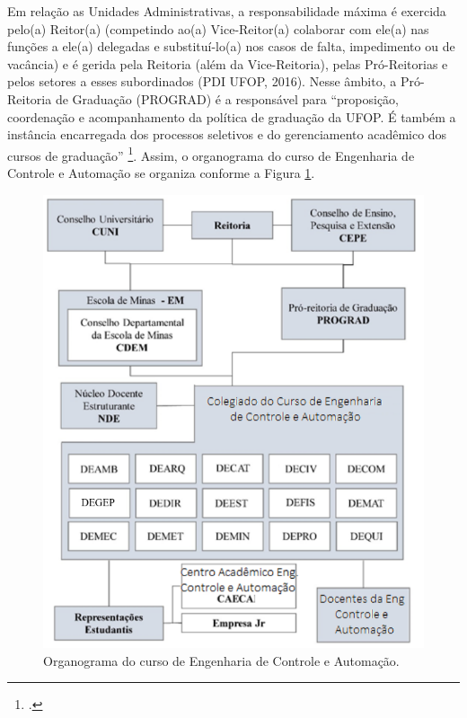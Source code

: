 \documentclass[
	12pt,				%
	openright,			%
	oneside,			%
	a4paper,			%
	english,			%
	brazil				%
	]{abntex2}
\begin{document}
Em relação as Unidades Administrativas, a responsabilidade máxima é exercida pelo(a) Reitor(a) (competindo ao(a) Vice-Reitor(a) colaborar com ele(a) nas funções a ele(a) delegadas e substituí-lo(a) nos casos de falta, impedimento ou de vacância) e é gerida pela Reitoria (além da Vice-Reitoria), pelas Pró-Reitorias e pelos setores a esses subordinados (PDI UFOP, 2016). Nesse âmbito, a Pró-Reitoria de Graduação (PROGRAD) é a responsável para “proposição, coordenação e acompanhamento da política de graduação da UFOP. É também a instância encarregada dos processos seletivos e do gerenciamento acadêmico dos cursos de graduação” \footcite{PDI-UFOP}. Assim, o organograma do curso de Engenharia de Controle e Automação se organiza conforme a Figura \ref{fig:organograma}.

\begin{figure}[hbtp]
	\centering
	\includegraphics[scale=0.7]{estrutura-administrativa}
	\caption{Organograma do curso de Engenharia de Controle e Automação.}
	\label{fig:organograma}
\end{figure}
\end{document}
